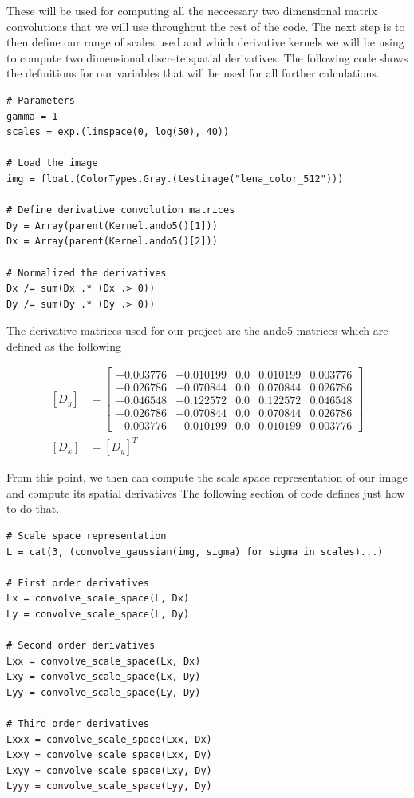 \documentclass{article}
\begin{document}
These will be used for computing all the neccessary two dimensional matrix convolutions that we will use throughout the rest of the code.
The next step is to then define our range of scales used and which derivative kernels we will be using to compute two dimensional discrete spatial derivatives.
The following code shows the definitions for our variables that will be used for all further calculations. 

\begin{lstlisting}
# Parameters
gamma = 1
scales = exp.(linspace(0, log(50), 40))

# Load the image
img = float.(ColorTypes.Gray.(testimage("lena_color_512")))

# Define derivative convolution matrices
Dy = Array(parent(Kernel.ando5()[1]))
Dx = Array(parent(Kernel.ando5()[2]))

# Normalized the derivatives
Dx /= sum(Dx .* (Dx .> 0))
Dy /= sum(Dy .* (Dy .> 0))
\end{lstlisting}

The derivative matrices used for our project are the ando5 matrices which are defined as the following

\begin{equation}
  \begin{aligned}
    [D_y] &=
    \begin{bmatrix}
      -0.003776 &-0.010199  &0.0  &0.010199  &0.003776 \\
      -0.026786 &-0.070844  &0.0  &0.070844  &0.026786 \\
      -0.046548 &-0.122572  &0.0  &0.122572  &0.046548 \\
      -0.026786 &-0.070844  &0.0  &0.070844  &0.026786 \\
      -0.003776 &-0.010199  &0.0  &0.010199  &0.003776
    \end{bmatrix} \\
    [D_x] &= [D_y]^T
  \end{aligned}
\end{equation}

From this point, we then can compute the scale space representation of our image and compute its spatial derivatives
The following section of code defines just how to do that.

\begin{lstlisting}
# Scale space representation
L = cat(3, (convolve_gaussian(img, sigma) for sigma in scales)...)

# First order derivatives
Lx = convolve_scale_space(L, Dx)
Ly = convolve_scale_space(L, Dy)

# Second order derivatives
Lxx = convolve_scale_space(Lx, Dx)
Lxy = convolve_scale_space(Lx, Dy)
Lyy = convolve_scale_space(Ly, Dy)

# Third order derivatives
Lxxx = convolve_scale_space(Lxx, Dx)
Lxxy = convolve_scale_space(Lxx, Dy)
Lxyy = convolve_scale_space(Lxy, Dy)
Lyyy = convolve_scale_space(Lyy, Dy)
\end{lstlisting}
\end{document}
